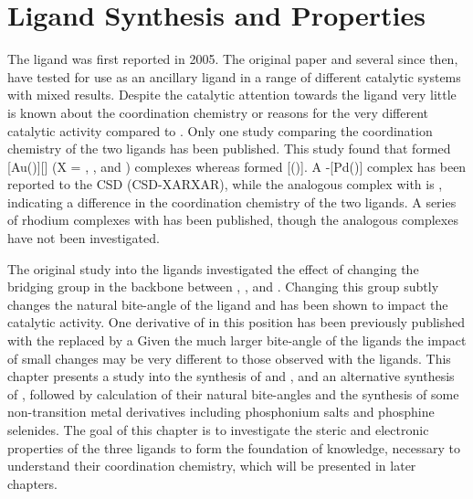 
\chapter{Ligand Synthesis and Properties}
\label{ch:ligands}

The \tBuxantphos{} ligand was first reported in 2005.\cite{Mispelaere2005} The original paper and several since then, have tested \tBuxantphos{} for use as an ancillary ligand in a range of different catalytic systems with mixed results.\cite{Dongol2007, Ohshima2009, Cabello2007, Friis2014, Dang2013, Liu2013c, Raoufmoghaddam2013, Haibach2013, Ashcroft2013, Behr2013, Raoufmoghaddam2013b, Zhan2012}  Despite the catalytic attention towards the \tBuxantphos{} ligand very little is known about the coordination chemistry or reasons for the very different catalytic activity compared to \Phxantphos{}.  Only one study comparing the coordination chemistry of the two ligands has been published.\cite{Partyka2010}  This study found that \tBuxantphos{} formed [Au(\tBuxantphos)][] (X = , , and ) complexes whereas \Phxantphos{} formed [(\Phxantphos)].  A \trans-[Pd(\tBuxantphos)] complex has been reported to the \gls{CSD} (CSD-XARXAR), while the analogous complex with \Phxantphos{} is \cis{}, indicating a difference in the coordination chemistry of the two ligands.\cite{Allen2002}  A series of rhodium complexes with \tBuxantphos{} has been published,\cite{Haibach2013} though the analogous \Phxantphos{} complexes have not been investigated.

The original study into the \Phxantphos{} ligands investigated the effect of changing the bridging group in the backbone between , , and .\cite{Kranenburg1995}  Changing this group subtly changes the natural bite-angle of the ligand and has been shown to impact the catalytic activity.\cite{Birkholz2009}  One derivative of \tBuxantphos{} in this position has been previously published with the  replaced by a \cite{Marimuthu2012}  Given the much larger bite-angle of the \tBuxantphos{} ligands the impact of small changes may be very different to those observed with the \Phxantphos{} ligands.  This chapter presents a study into the synthesis of \tBusixantphos{} and \tButhixantphos, and an alternative synthesis of \tBuxantphos{}, followed by calculation of their natural bite-angles and the synthesis of some non-transition metal derivatives including phosphonium salts and phosphine selenides.  The goal of this chapter is to investigate the steric and electronic properties of the three \tBuxantphos{} ligands to form the foundation of knowledge, necessary to understand their coordination chemistry, which will be presented in later chapters.  

